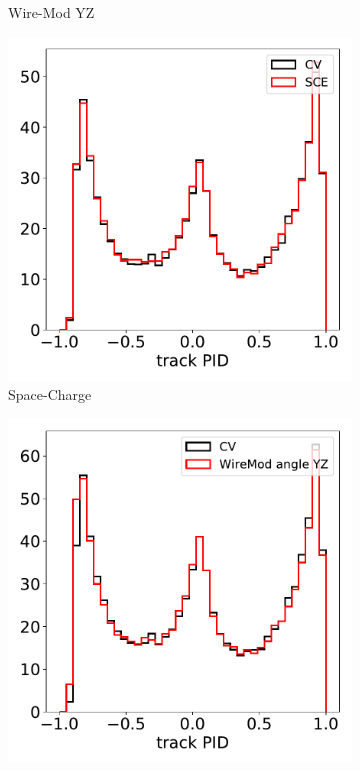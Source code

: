 \documentclass[a4paper]{article}
\begin{document}
\begin{figure}[H]
\begin{center}
\begin{subfigure}[b]{0.19\textwidth}
    \caption{\label{fig:detsys:trkpid:WMYZ}Wire-Mod YZ}
    \end{subfigure}
    \begin{subfigure}[b]{0.19\textwidth}
    \centering
    \includegraphics[width=1.00\textwidth]{detsys/trkpid/trkpid_03232020_SCE.pdf}
    \caption{\label{fig:detsys:trkpid:SCE}Space-Charge}
    \end{subfigure}
    \begin{subfigure}[b]{0.19\textwidth}
    \centering
    \includegraphics[width=1.00\textwidth]{detsys/trkpid/trkpid_03232020_WireMod_angle_YZ.pdf}

\end{subfigure}
\end{center}
\end{figure}
\end{document}
